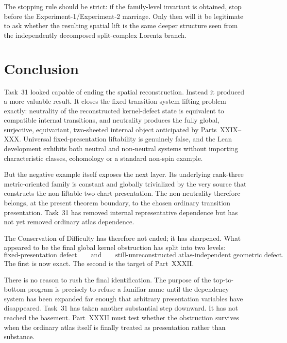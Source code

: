 \documentclass[11pt,a4paper]{article}
\theoremstyle{definition}
\begin{document}
The stopping rule should be strict: if the family-level invariant is obtained, stop before the Experiment-1/Experiment-2 marriage.  Only then will it be legitimate to ask whether the resulting spatial lift is the same deeper structure seen from the independently decomposed split-complex Lorentz branch.

\section{Conclusion}\label{sec:conclusion}

Task~31 looked capable of ending the spatial reconstruction.  Instead it produced a more valuable result.  It closes the fixed-transition-system lifting problem exactly: neutrality of the reconstructed kernel-defect state is equivalent to compatible internal transitions, and neutrality produces the fully global, surjective, equivariant, two-sheeted internal object anticipated by Parts~XXIX--XXX.  Universal fixed-presentation liftability is genuinely false, and the Lean development exhibits both neutral and non-neutral systems without importing characteristic classes, cohomology or a standard non-spin example.

But the negative example itself exposes the next layer.  Its underlying rank-three metric-oriented family is constant and globally trivialized by the very source that constructs the non-liftable two-chart presentation.  The non-neutrality therefore belongs, at the present theorem boundary, to the chosen ordinary transition presentation.  Task~31 has removed internal representative dependence but has not yet removed ordinary atlas dependence.

The Conservation of Difficulty has therefore not ended; it has sharpened.  What appeared to be the final global kernel obstruction has split into two levels:
\[
 \text{fixed-presentation defect}
 \qquad\text{and}\qquad
 \text{still-unreconstructed atlas-independent geometric defect}.
\]
The first is now exact.  The second is the target of Part~XXXII.

There is no reason to rush the final identification.  The purpose of the top-to-bottom program is precisely to refuse a familiar name until the dependency system has been expanded far enough that arbitrary presentation variables have disappeared.  Task~31 has taken another substantial step downward.  It has not reached the basement.  Part~XXXII must test whether the obstruction survives when the ordinary atlas itself is finally treated as presentation rather than substance.

\printbibliography
\end{document}
